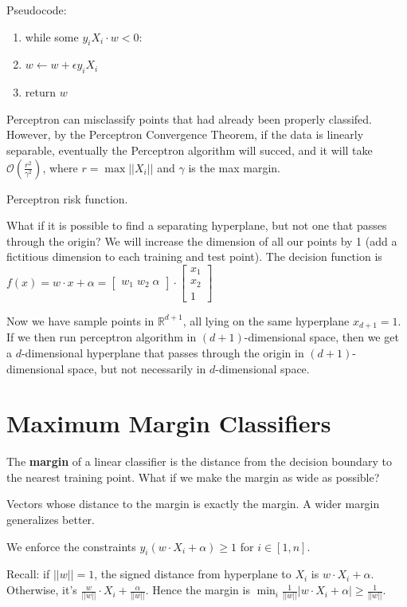 Pseudocode:
\begin{enumerate}
    \item while some $y_iX_i \cdot w < 0$:
    \item \tab $w \gets w + \epsilon y_i X_i$
    \item return $w$
\end{enumerate}
Perceptron can misclassify points that had already been properly classifed.
However, by the Perceptron Convergence Theorem, if the data is linearly separable, eventually the Perceptron algorithm will succed, and it will take $\mathcal O (\frac{r^2}{\gamma^2})$, where $r = \max ||X_i||$ and $\gamma$ is the max margin.

Perceptron risk function.

What if it is possible to find a separating hyperplane, but not one that passes through the origin?
We will increase the dimension of all our points by 1 (add a fictitious dimension to each training and test point).
The decision function is $f(x) = w \cdot x + \alpha = \begin{bmatrix}
    w_1 \; w_2\; \alpha
\end{bmatrix} \cdot
\begin{bmatrix}
    x_1 \\
    x_2 \\
    1
\end{bmatrix}$

Now we have sample points in $\mathbb R ^{d+1}$,
all lying on the same hyperplane $x_{d+1} = 1$.
If we then run perceptron algorithm in $(d+1)$-dimensional space, then we get a $d$-dimensional hyperplane that passes through the origin in $(d+1)$-dimensional space, but not necessarily in $d$-dimensional space.

\section{Maximum Margin Classifiers}
The \textbf{margin} of a linear classifier is the distance from the decision boundary to the nearest training point.
What if we make the margin as wide as possible?

Vectors whose distance to the margin is exactly the margin.
A wider margin generalizes better.

We enforce the constraints
$y_i(w \cdot X_i + \alpha) \geq 1$ for $i \in [1, n]$.

Recall: if $||w|| = 1$, the signed distance from hyperplane to $X_i$ is $w \cdot X_i + \alpha$.
Otherwise, it's $\frac{w}{||w||} \cdot X_i + \frac{\alpha}{||w||}$.
Hence the margin is $\min_i \frac{1}{||w||}|w \cdot X_i + \alpha| \geq \frac{1}{||w||}$.

